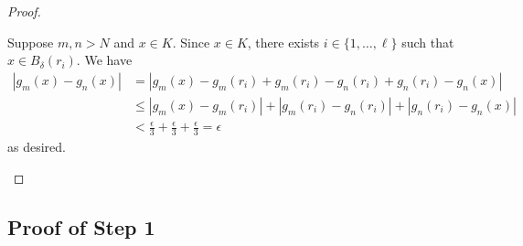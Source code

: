 \begin{proof}
\begin{enumerate}
            Suppose \( m,n > N  \) and \( x \in K  \). Since \( x \in K  \), there exists \( i \in \{ 1, \dots, \ell  \}  \) such that \( x \in {B}_{\delta}({r}_{i}) \). We have 
        \begin{align*}
            | {g}_{m}(x) - {g}_{n}(x) | &= | {g}_{m}(x) - {g}_{m}({r}_{i}) + {g}_{m}({r}_{i}) - {g}_{n}({r}_{i}) + {g}_{n}({r}_{i}) - {g}_{n}(x) |   \\
                                        &\leq | {g}_{m}(x) - {g}_{m}({r}_{i}) |  + | {g}_{m}({r}_{i}) - {g}_{n}({r}_{i}) |  + | {g}_{n}({r}_{i}) - {g}_{n}(x) | \\ 
                                        &< \frac{ \epsilon }{ 3 }  + \frac{ \epsilon }{ 3 }  + \frac{ \epsilon }{ 3 } = \epsilon
        \end{align*}
        as desired.
    \end{enumerate}
\end{proof}

\subsection*{Proof of Step 1}

